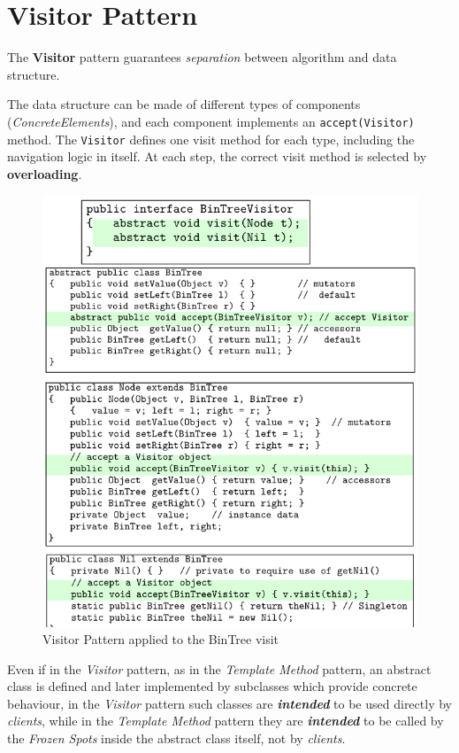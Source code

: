 \newpage
\section{Visitor Pattern}
\begin{paracol}{2}
   \colfill
   The \textbf{Visitor} pattern guarantees \textit{separation} between algorithm
   and data structure.
   \nl

   The data structure can be made of different types of components (\textit{ConcreteElements}), and each component implements an
   \lstinline|accept(Visitor)| method.
   The \lstinline|Visitor| defines one visit method
   for each type, including the navigation logic in itself.
   At each step, the correct visit method
   is selected by \textbf{overloading}.
   \colfill
   \switchcolumn

   \begin{figure}[htbp]
      \centering
      \includegraphics[width=0.9\columnwidth]{images/visitorpattern_treecode.png}
      \caption{Visitor Pattern applied to the BinTree visit}
      \label{fig:visitorpattern_treecode}
   \end{figure}
\end{paracol}

Even if in the \textit{Visitor} pattern, as in the \textit{Template Method} pattern, an abstract class is defined and later implemented by subclasses which provide concrete behaviour,
in the \textit{Visitor} pattern such classes are \textit{\textbf{intended}} to be used directly by \textit{clients},
while in the \textit{Template Method} pattern they are \textit{\textbf{intended}} to be called by the \textit{Frozen Spots} inside the abstract class itself, not by \textit{clients}.